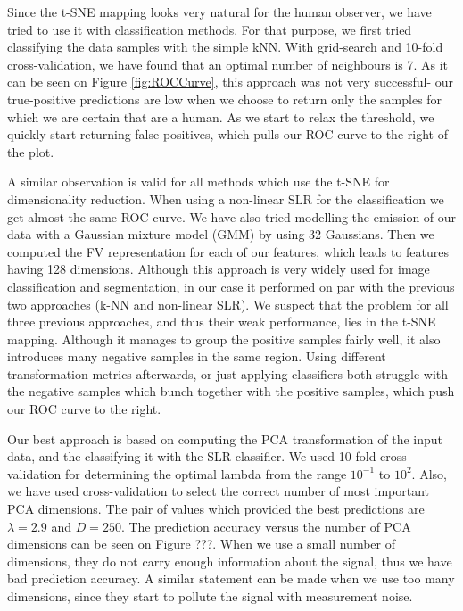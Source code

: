 \documentclass{article} %
\begin{document}

Since the t-SNE mapping looks very natural for the human observer, 
we have tried to use it with classification methods. For that purpose, 
we first tried classifying the data samples with the simple kNN. 
With grid-search and 10-fold cross-validation, we have found that an optimal
number of neighbours is 7.
As it can be seen on Figure \ref{fig:ROCCurve}, this approach was not very
successful- our true-positive predictions are low 
when we choose to return only the samples for which we are certain that are a human. 
As we start to relax the threshold, we quickly start returning false positives, which pulls 
our ROC curve to the right of the plot.

A similar observation is valid for all methods which use the t-SNE for dimensionality reduction. 
When using a non-linear SLR for the classification we get almost the same ROC curve. 
We have also tried modelling the emission of our data with a Gaussian mixture model (GMM) by using 32 Gaussians.
 Then we computed the FV representation for each of our features, which leads to features having 128 dimensions.
  Although this approach is very widely used for image classification and segmentation, 
  in our case it performed on par with the previous two approaches (k-NN and non-linear SLR).
   We suspect that the problem for all three previous approaches, and thus their weak performance, 
   lies in the t-SNE mapping. Although it manages to group the positive samples fairly well, 
   it also introduces many negative samples in the same region. Using different transformation metrics 
   afterwards, or just applying classifiers both struggle with the negative samples which 
   bunch together with the positive samples, which push our ROC curve to the right.

Our best approach is based on computing the PCA transformation of the input data, and the classifying 
it with the SLR classifier. We used 10-fold cross-validation for determining the
optimal lambda from the range $10^{-1}$ to $10^{2}$. Also, we have used cross-validation to select the correct number of 
most important PCA dimensions. The pair of values which provided the best predictions 
are $\lambda = 2.9$ and $D = 250$. The prediction accuracy versus the number of PCA 
dimensions can be seen on Figure ???. When we use a small number of dimensions, they 
do not carry enough information about the signal, thus we have bad prediction accuracy. 
A similar statement can be made when we use too many dimensions, since they start to 
pollute the signal with measurement noise.
\end{document}
